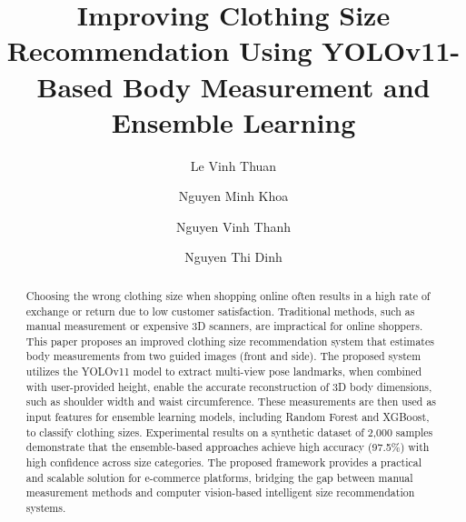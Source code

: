 \documentclass{llncs}
\begin{document}
\title{Improving Clothing Size Recommendation Using YOLOv11-Based Body Measurement and Ensemble Learning}

\author{Le Vinh Thuan \and Nguyen Minh Khoa \and Nguyen Vinh Thanh \and Nguyen Thi Dinh }




\maketitle

\begin{abstract}
    Choosing the wrong clothing size when shopping online often results in a high rate of exchange or return due to low customer satisfaction. 
    Traditional methods, such as manual measurement or expensive 3D scanners, are impractical for online shoppers. 
    This paper proposes an improved clothing size recommendation system that estimates body measurements from two guided images (front and side). 
    The proposed system utilizes the YOLOv11 model to extract multi-view pose landmarks, 
        when combined with user-provided height, enable the accurate reconstruction of 3D body dimensions, such as shoulder width and waist circumference. 
    These measurements are then used as input features for ensemble learning models, including Random Forest and XGBoost, to classify clothing sizes. 
    Experimental results on a synthetic dataset of 2,000 samples demonstrate that the ensemble-based approaches achieve high accuracy (97.5\%) with high confidence across size categories. 
    The proposed framework provides a practical and scalable solution for e-commerce platforms, 
        bridging the gap between manual measurement methods and computer vision-based intelligent size recommendation systems.
\end{abstract}


\end{document}
